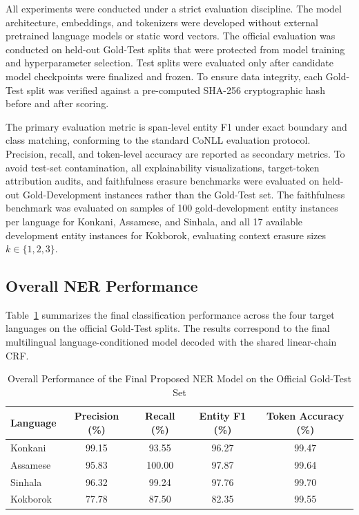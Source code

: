 \documentclass[pdflatex,sn-mathphys-num]{sn-jnl}
\begin{document}
All experiments were conducted under a strict evaluation discipline. The model architecture, embeddings, and tokenizers were developed without external pretrained language models or static word vectors. The official evaluation was conducted on held-out Gold-Test splits that were protected from model training and hyperparameter selection. Test splits were evaluated only after candidate model checkpoints were finalized and frozen. To ensure data integrity, each Gold-Test split was verified against a pre-computed SHA-256 cryptographic hash before and after scoring.

The primary evaluation metric is span-level entity F1 under exact boundary and class matching, conforming to the standard CoNLL evaluation protocol. Precision, recall, and token-level accuracy are reported as secondary metrics. To avoid test-set contamination, all explainability visualizations, target-token attribution audits, and faithfulness erasure benchmarks were evaluated on held-out Gold-Development instances rather than the Gold-Test set. The faithfulness benchmark was evaluated on samples of 100 gold-development entity instances per language for Konkani, Assamese, and Sinhala, and all 17 available development entity instances for Kokborok, evaluating context erasure sizes $k \in \{1, 2, 3\}$.

\subsection{Overall NER Performance}\label{subsec:overall_perf}

Table~\ref{tab:overall_perf} summarizes the final classification performance across the four target languages on the official Gold-Test splits. The results correspond to the final multilingual language-conditioned model decoded with the shared linear-chain CRF.

\begin{table}[htbp]
\centering
\caption{Overall Performance of the Final Proposed NER Model on the Official Gold-Test Set}
\label{tab:overall_perf}
\small
\begin{tabular}{lcccc}
\toprule
\textbf{Language} & \textbf{Precision (\%)} & \textbf{Recall (\%)} & \textbf{Entity F1 (\%)} & \textbf{Token Accuracy (\%)} \\
\midrule
Konkani  & 99.15 & 93.55 & 96.27 & 99.47 \\
Assamese & 95.83 & 100.00 & 97.87 & 99.64 \\
Sinhala  & 96.32 & 99.24 & 97.76 & 99.70 \\
Kokborok & 77.78 & 87.50 & 82.35 & 99.55 \\
\bottomrule
\end{tabular}
\end{table}
\end{document}
